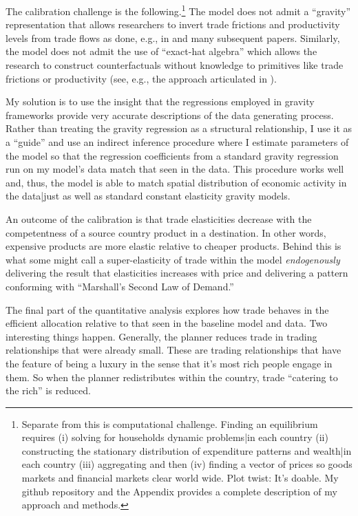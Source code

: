 \documentclass[12pt,pdftex]{article}
\begin{document}
\begin{onehalfspacing}
The calibration challenge is the following.\footnote{Separate from this is computational challenge. Finding an equilibrium requires (i) solving for households dynamic problems|in each country (ii) constructing the stationary distribution of expenditure patterns and wealth|in each country (iii) aggregating and then (iv) finding a vector of prices so goods markets and financial markets clear world wide. Plot twist: It's doable. My github repository and the Appendix provides a complete description of my approach and methods.} The model does not admit a ``gravity'' representation that allows researchers to invert trade frictions and productivity levels from trade flows as done, e.g., in \citet{eaton2002technology} and many subsequent papers. Similarly, the model does not admit the use of ``exact-hat algebra'' which allows the research to construct counterfactuals without knowledge to primitives like trade frictions or productivity (see, e.g., the approach articulated in \citet{costinot2014trade}).

My solution is to use the insight that the regressions employed in gravity frameworks provide very accurate descriptions of the data generating process. Rather than treating the gravity regression as a structural relationship, I use it as a ``guide'' and use an indirect inference procedure where I estimate parameters of the model so that the regression coefficients from a standard gravity regression run on my model's data match that seen in the data. This procedure works well and, thus, the model is able to match spatial distribution of economic activity in the data|just as well as standard constant elasticity gravity models.

An outcome of the calibration is that trade elasticities decrease with the competentness of a source country product in a destination. In other words, expensive products are more elastic relative to cheaper products. Behind this is what some might call a  super-elasticity of trade within the model \emph{endogenously} delivering the result that elasticities increases with price and delivering a pattern conforming with ``Marshall's Second Law of Demand.''

The final part of the quantitative analysis explores how trade behaves in the efficient allocation relative to that seen in the baseline model and data. Two interesting things happen. Generally, the planner reduces trade in trading relationships that were already small. These are trading relationships that have the feature of being a luxury in the sense that it's most rich people engage in them. So when the planner redistributes within the country, trade ``catering to the rich'' is reduced.


\end{onehalfspacing}
\end{document}

